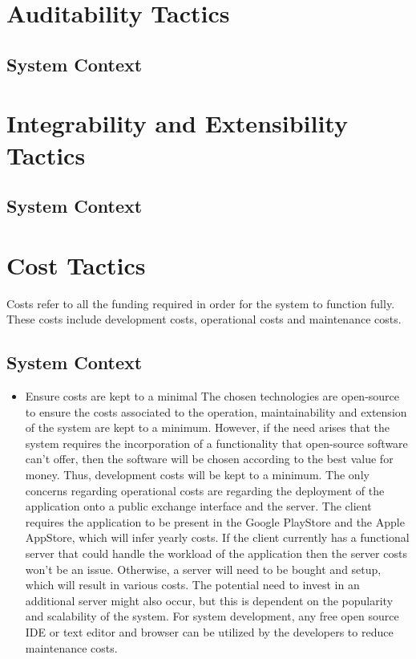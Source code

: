 \documentclass[11pt,fleqn]{book} %
\begin{document}
	\section{Auditability Tactics}
	\subsection{System Context}
	\section{Integrability and Extensibility Tactics}
	\subsection{System Context}
	\section{Cost Tactics}
	Costs refer to all the funding required in order for the system to function fully. These costs include development costs, operational costs and maintenance costs.
	\subsection{System Context}
	\begin{itemize}
		\item Ensure costs are kept to a minimal \newline\newline
		The chosen technologies are open-source to ensure the costs associated to the operation, maintainability and extension of the system are kept to a minimum. However, if the need arises that the system requires the incorporation of a functionality that open-source software can’t offer, then the software will be chosen according to the best value for money. Thus, development costs will be kept to a minimum. The only concerns regarding operational costs are regarding the deployment of the application onto a public exchange interface and the server. The client requires the application to be present in the Google PlayStore and the Apple AppStore, which will infer yearly costs. If the client currently has a functional server that could handle the workload of the application then the server costs won’t be an issue. Otherwise, a server will need to be bought and setup, which will result in various costs. The potential need to invest in an additional server might also occur, but this is dependent on the popularity and scalability of the system. For system development, any free open source IDE or text editor and browser can be utilized by the developers to reduce maintenance costs.
		
	\end{itemize}
\end{document}

